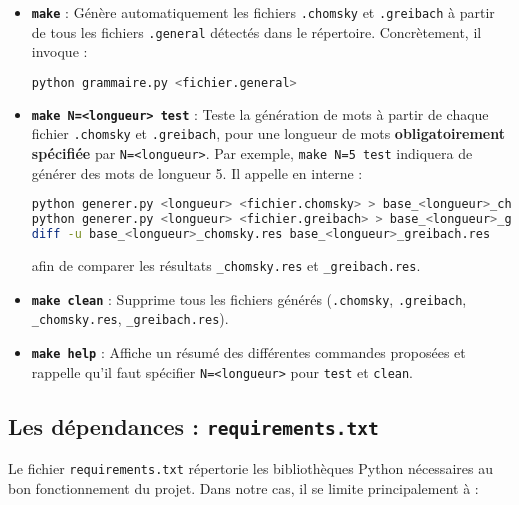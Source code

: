 \documentclass[a4paper,12pt]{article}
\begin{document}
\begin{itemize}
    \item \textbf{\texttt{make}} : Génère automatiquement les fichiers \texttt{.chomsky} et \texttt{.greibach} à partir de tous les fichiers \texttt{.general} détectés dans le répertoire. Concrètement, il invoque :
\begin{lstlisting}[language=bash, caption={Extrait de Makefile pour la cible `all`}, label={lst:make-all}]
python grammaire.py <fichier.general>
\end{lstlisting}

    \item \textbf{\texttt{make N=<longueur> test}} : Teste la génération de mots à partir de chaque fichier \texttt{.chomsky} et \texttt{.greibach}, pour une longueur de mots \textbf{obligatoirement spécifiée} par \texttt{N=<longueur>}.  
    Par exemple, \texttt{make N=5 test} indiquera de générer des mots de longueur 5. Il appelle en interne :
\begin{lstlisting}[language=bash, caption={Extrait de Makefile pour la cible `test`}, label={lst:make-test}]
python generer.py <longueur> <fichier.chomsky> > base_<longueur>_chomsky.res
python generer.py <longueur> <fichier.greibach> > base_<longueur>_greibach.res
diff -u base_<longueur>_chomsky.res base_<longueur>_greibach.res
\end{lstlisting}

    afin de comparer les résultats \texttt{\_chomsky.res} et \texttt{\_greibach.res}.

    \item \textbf{\texttt{make clean}} : Supprime tous les fichiers générés (\texttt{.chomsky}, \texttt{.greibach}, \texttt{\_chomsky.res}, \texttt{\_greibach.res}).

    \item \textbf{\texttt{make help}} : Affiche un résumé des différentes commandes proposées et rappelle qu’il faut spécifier \texttt{N=<longueur>} pour \texttt{test} et \texttt{clean}.
\end{itemize}

\subsection{Les dépendances : \texttt{requirements.txt}}
\label{subsec:requirements}

Le fichier \texttt{requirements.txt} répertorie les bibliothèques Python nécessaires au bon fonctionnement du projet. Dans notre cas, il se limite principalement à :
\end{document}
